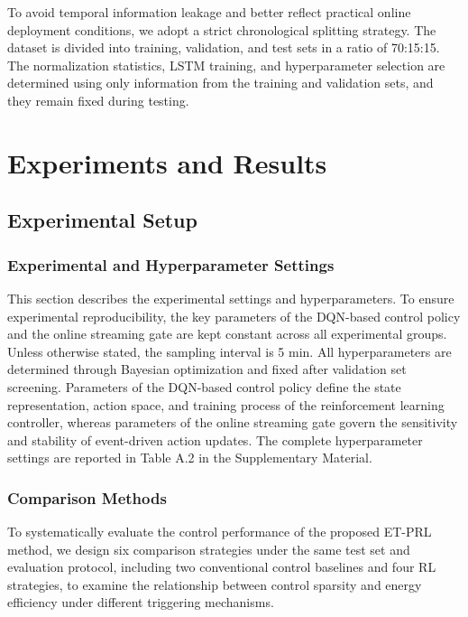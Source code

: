\documentclass[preprint,12pt]{elsarticle}
\begin{document}
To avoid temporal information leakage and better reflect practical online deployment conditions, we adopt a strict chronological splitting strategy. The dataset is divided into training, validation, and test sets in a ratio of 70:15:15. The normalization statistics, LSTM training, and hyperparameter selection are determined using only information from the training and validation sets, and they remain fixed during testing.

\section{Experiments and Results}\label{experiments-and-results}

\subsection{Experimental Setup}\label{experimental-setup}

\subsubsection{Experimental and Hyperparameter Settings}\label{experimental-and-hyperparameter-settings}

This section describes the experimental settings and hyperparameters. To ensure experimental reproducibility, the key parameters of the DQN-based control policy and the online streaming gate are kept constant across all experimental groups. Unless otherwise stated, the sampling interval is 5 min. All hyperparameters are determined through Bayesian optimization and fixed after validation set screening. Parameters of the DQN-based control policy define the state representation, action space, and training process of the reinforcement learning controller, whereas parameters of the online streaming gate govern the sensitivity and stability of event-driven action updates. The complete hyperparameter settings are reported in Table A.2 in the Supplementary Material.

\subsubsection{Comparison Methods}\label{comparison-methods}

To systematically evaluate the control performance of the proposed ET-PRL method, we design six comparison strategies under the same test set and evaluation protocol, including two conventional control baselines and four RL strategies, to examine the relationship between control sparsity and energy efficiency under different triggering mechanisms.
\end{document}
